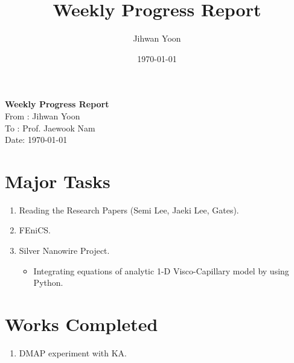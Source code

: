 \documentclass{article}
\title{Weekly Progress Report}
\author{Jihwan Yoon}
\date{\today}
\begin{document}
\begin{center}
 {\LARGE \bf Weekly Progress Report}\\[15pt]
 {\Large From : Jihwan Yoon\\[5pt]  To : Prof. Jaewook Nam\\[10pt] Date: \today}\\[30pt]
\end{center}


\section{Major Tasks}
\begin{enumerate}
 \item Reading the Research Papers (Semi Lee, Jaeki Lee, Gates).
      
 \item FEniCS.
 \item Silver Nanowire Project.
       \begin{itemize}
        \item Integrating equations of analytic 1-D Visco-Capillary model by using Python.
       \end{itemize}
\end{enumerate}
\vspace{5mm}


\section{Works Completed}
\begin{enumerate}
 \item DMAP experiment with KA.
\end{enumerate}
\vspace{5mm}
\end{document}
